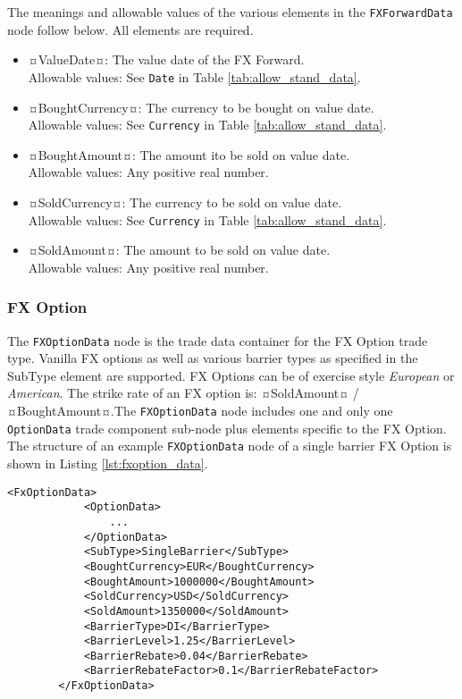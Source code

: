 The meanings and allowable values of the various elements in the \lstinline!FXForwardData!  node follow below.  All elements are required.

\begin{itemize}
\item ¤ValueDate¤: The value date of the FX Forward. \\ Allowable values:  See \lstinline!Date! in Table \ref{tab:allow_stand_data}.
\item ¤BoughtCurrency¤: The currency to be bought on value date.  \\ Allowable values:  See \lstinline!Currency! in Table \ref{tab:allow_stand_data}.
\item ¤BoughtAmount¤: The amount ito be sold on value date.  \\ Allowable values:  Any positive real number.
\item ¤SoldCurrency¤: The currency to be sold on value date.  \\ Allowable values:  See \lstinline!Currency! in Table \ref{tab:allow_stand_data}.
\item ¤SoldAmount¤: The amount to be sold on value date.  \\ Allowable values:  Any positive real number.

\end{itemize}


\subsubsection{FX Option}

The \lstinline!FXOptionData!  node is the trade data container for the FX Option trade type.  Vanilla FX options as well as various barrier types as specified in the SubType element are supported. FX Options can be of exercise style \emph{European} or \emph{American}. The strike rate of an FX option is: ¤SoldAmount¤ / ¤BoughtAmount¤.The \lstinline!FXOptionData!  node includes one and only one  \lstinline!OptionData! trade component sub-node plus elements specific to the FX Option. The structure of an example \lstinline!FXOptionData!  node of a single barrier FX Option is shown in Listing \ref{lst:fxoption_data}.  

{\footnotesize
\begin{lstlisting}[caption=FXOptionData, label=lst:fxoption_data]
        <FxOptionData>
            <OptionData>
            	...
            </OptionData>
            <SubType>SingleBarrier</SubType>
            <BoughtCurrency>EUR</BoughtCurrency>
            <BoughtAmount>1000000</BoughtAmount>
            <SoldCurrency>USD</SoldCurrency>
            <SoldAmount>1350000</SoldAmount>
            <BarrierType>DI</BarrierType>
            <BarrierLevel>1.25</BarrierLevel>
            <BarrierRebate>0.04</BarrierRebate>
            <BarrierRebateFactor>0.1</BarrierRebateFactor>
        </FxOptionData>
\end{lstlisting}
}

